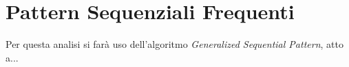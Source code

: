 \chapter{Pattern Sequenziali Frequenti}

Per questa analisi si farà uso dell'algoritmo \textit{Generalized Sequential Pattern}, atto a...